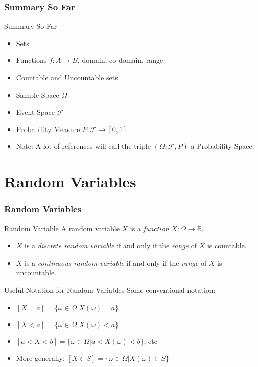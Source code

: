 \documentclass{beamer}
\begin{document}
\begin{frame}
  \frametitle{Summary So Far}
  \begin{block}{Summary So Far}
    \begin{itemize}
      \item<1-> Sets
      \item<2-> Functions $f: A \rightarrow B$, domain, co-domain, range
      \item<3-> Countable and Uncountable sets
      \item<4-> Sample Space $\Omega$
      \item<5-> Event Space $\mathscr{F}$
      \item<6-> Probability Measure $P: \mathscr{F} \rightarrow [0,1]$
      \item<6-> Note: A lot of references will call the triple $(\Omega, \mathscr{F}, P)$ a Probability Space.
    \end{itemize}
  \end{block}
\end{frame}


\section{Random Variables}


\begin{frame}
  \frametitle{Random Variables}
  \begin{alertblock}{Random Variable \parencite[p.~143]{daners}}
    A random variable $X$ is a \emph{function} $X: \Omega \rightarrow \mathbb{R}$.
    \begin{itemize}
      \item<2-> $X$ is a \emph{discrete random variable} if and only if the \emph{range} of $X$ is countable.
      \item<3-> $X$ is a \emph{continuous random variable} if and only if the \emph{range} of $X$ is uncountable.
    \end{itemize}
  \end{alertblock}
  \pause\pause\pause
  \begin{block}{Useful Notation for Random Variables}
    Some conventional notation:
    \begin{itemize}
      \item<5-> $[X = a] = \{\omega \in \Omega | X(\omega) = a\}$
      \item<6-> $[X < a] = \{\omega \in \Omega | X(\omega) < a\}$
      \item<7-> $[a < X < b] = \{\omega \in \Omega | a < X(\omega) < b\}$, etc
      \item<8-> More generally: $[X \in S] = \{\omega \in \Omega | X(\omega) \in S\}$
    \end{itemize}
  \end{block}
\end{frame}
\end{document}
